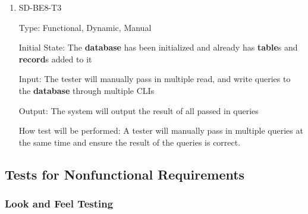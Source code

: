 \documentclass[12pt, titlepage]{article}
\begin{document}
\begin{enumerate}
\item{SD-BE8-T3}

Type: Functional, Dynamic, Manual
					
Initial State: The \textbf{database} has been initialized and already has \textbf{table}s and \textbf{record}s added to it
					
Input: The tester will manually pass in multiple read, and write queries to the \textbf{database} through multiple CLIs
					
Output: The system will output the result of all passed in queries
					
How test will be performed: A tester will manually pass in multiple queries at the same time and ensure the result of the queries is correct.

\end{enumerate}

\subsection{Tests for Nonfunctional Requirements}

\subsubsection{Look and Feel Testing}
		
\end{document}
